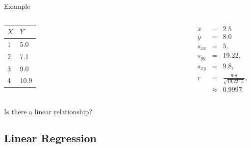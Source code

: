 \begin{frame}{Example}

    \begin{columns}

      \begin{tabular}{l|l}
        $X$ & $Y$ \\ \hline
        1 & 5.0 \\
        2 & 7.1  \\
        3 & 9.0 \\
        4 & 10.9
      \end{tabular}


      \begin{eqnarray*}
        \bar{x} & = & 2.5 \\
        \bar{y} & = & 8.0 \\
        s_{xx} & = & 5, \\
        s_{yy} & = & 19.22, \\
        s_{xy} & = & 9.8, \\
        r & = & \frac{9.8}{\sqrt{19.22 \cdot 5}}, \\
        & \approx & 0.9997.  
      \end{eqnarray*}

      \end{columns}


      Is there a linear relationship?

  
\end{frame}


\subsection{Linear Regression}

